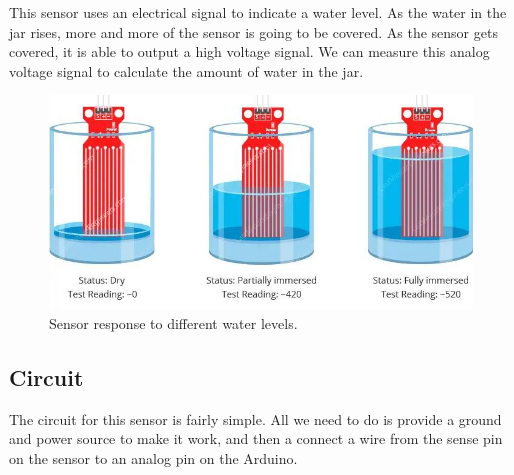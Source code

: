 \documentclass[12pt]{article}
\begin{document}
This sensor uses an electrical signal to indicate a water level. As the water in the jar rises, more and more of the sensor is going to be covered. As the sensor gets covered, it is able to output a high voltage signal. We can measure this analog voltage signal to calculate the amount of water in the jar.



\begin{figure}[H]
	\begin{center}
		\includegraphics[scale=0.55]{Water-Level-Sensor-Calibration}
		\caption{Sensor response to different water levels.}
		\label{water_level_sensor_basics}
	\end{center}
\end{figure}









\subsection{Circuit}

The circuit for this sensor is fairly simple. All we need to do is provide a ground and power source to make it work, and then a connect a wire from the sense pin on the sensor to an analog pin on the Arduino.
\end{document}

